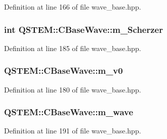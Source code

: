 Definition at line 166 of file wave\-\_\-base.\-hpp.

\hypertarget{class_q_s_t_e_m_1_1_c_base_wave_a0f2e220cc9a927581e70f7d5485bff86}{
\subsubsection[{m\-\_\-\-Scherzer}]{\setlength{\rightskip}{0pt plus 5cm}int Q\-S\-T\-E\-M\-::\-C\-Base\-Wave\-::m\-\_\-\-Scherzer\hspace{0.3cm}{\ttfamily [protected]}}}\label{class_q_s_t_e_m_1_1_c_base_wave_a0f2e220cc9a927581e70f7d5485bff86}


Definition at line 185 of file wave\-\_\-base.\-hpp.

\hypertarget{class_q_s_t_e_m_1_1_c_base_wave_a2f96ab363b44b72175c51a6267d91336}{
\subsubsection[{m\-\_\-v0}]{ Q\-S\-T\-E\-M\-::\-C\-Base\-Wave\-::m\-\_\-v0\hspace{0.3cm}{\ttfamily [protected]}}}\label{class_q_s_t_e_m_1_1_c_base_wave_a2f96ab363b44b72175c51a6267d91336}


Definition at line 180 of file wave\-\_\-base.\-hpp.

\hypertarget{class_q_s_t_e_m_1_1_c_base_wave_a32fa89b59ac46ace6398011150b1b7ee}{
\subsubsection[{m\-\_\-wave}]{ Q\-S\-T\-E\-M\-::\-C\-Base\-Wave\-::m\-\_\-wave\hspace{0.3cm}{\ttfamily [protected]}}}\label{class_q_s_t_e_m_1_1_c_base_wave_a32fa89b59ac46ace6398011150b1b7ee}


Definition at line 191 of file wave\-\_\-base.\-hpp.

